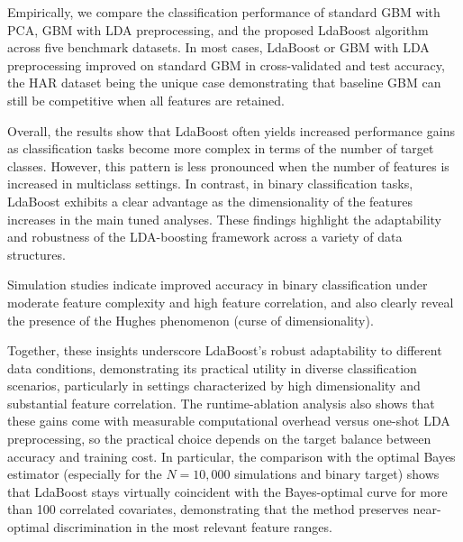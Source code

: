 \documentclass[11pt,a4paper]{article}
\begin{document}
Empirically, we compare the classification performance of standard GBM with PCA, GBM with LDA preprocessing, and the proposed LdaBoost algorithm across five benchmark datasets. In most cases, LdaBoost or GBM with LDA preprocessing improved on standard GBM in cross-validated and test accuracy, the HAR dataset being the unique case demonstrating that baseline GBM can still be competitive when all features are retained.

Overall, the results show that LdaBoost often yields increased performance gains as classification tasks become more complex in terms of the number of target classes. However, this pattern is less pronounced when the number of features is increased in multiclass settings. In contrast, in binary classification tasks, LdaBoost exhibits a clear advantage as the dimensionality of the features increases in the main tuned analyses. These findings highlight the adaptability and robustness of the LDA-boosting framework across a variety of data structures.

Simulation studies indicate improved accuracy in binary classification under moderate feature complexity and high feature correlation, and also clearly reveal the presence of the Hughes phenomenon (curse of dimensionality).

Together, these insights underscore LdaBoost’s robust adaptability to different data conditions, demonstrating its practical utility in diverse classification scenarios, particularly in settings characterized by high dimensionality and substantial feature correlation. The runtime-ablation analysis also shows that these gains come with measurable computational overhead versus one-shot LDA preprocessing, so the practical choice depends on the target balance between accuracy and training cost. In particular, the comparison with the optimal Bayes estimator (especially for the $N=10{,}000$ simulations and binary target) shows that LdaBoost stays virtually coincident with the Bayes-optimal curve for more than 100 correlated covariates, demonstrating that the method preserves near-optimal discrimination in the most relevant feature ranges.

\newpage
\end{document}
